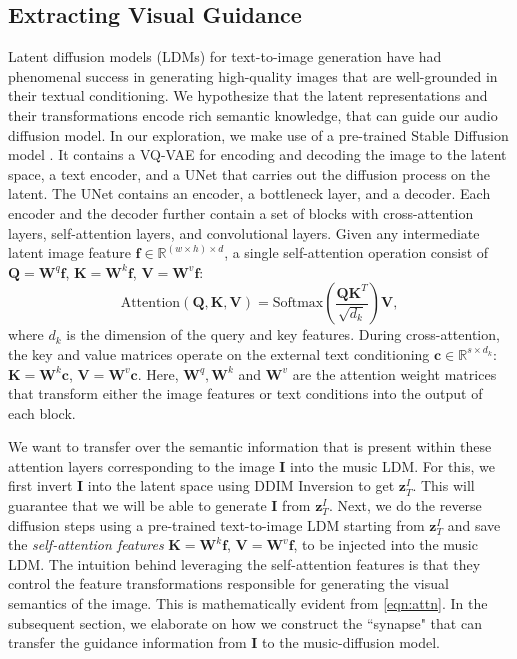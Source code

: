 \subsection{Extracting Visual Guidance} \label{sec:extracting_guidance}
Latent diffusion models (LDMs) for text-to-image generation \cite{rombach2022high} have had phenomenal success in generating high-quality images that are well-grounded in their textual conditioning. We hypothesize that the latent representations and their transformations encode rich semantic knowledge, that can guide our audio diffusion model. In our exploration, we make use of a pre-trained Stable Diffusion model \cite{rombach2022high}. It contains a VQ-VAE \cite{van2017neural} for encoding and decoding the image to the latent space, a text encoder, and a UNet \cite{unet} that carries out the diffusion process on the latent. The UNet contains an encoder, a bottleneck layer, and a decoder. Each encoder and the decoder further contain a set of blocks with cross-attention layers, self-attention layers, and convolutional layers. Given any intermediate latent image feature $\bm{f} \in \mathbb{R}^{(w \times h) \times d}$, a single self-attention \cite{attention} operation consist of $\bm{Q} = \bm{W}^q \bm{f}$, $\bm{K} = \bm{W}^k \bm{f}$, $\bm{V} = \bm{W}^v \bm{f}$:
\begin{equation}
    \text{Attention}(\bm{Q}, \bm{K}, \bm{V}) = \text{Softmax}\left(\frac{\bm{Q} \bm{K}^T}{\sqrt{d_k}}\right)\bm{V},
    \label{eqn:attn}
\end{equation}
where $d_k$ is the dimension of the query and key features. During cross-attention, the key and value matrices operate on the external text conditioning $\bm{c} \in \mathbb{R}^{s \times d_k}$: $\bm{K} = \bm{W}^k \bm{c}$, $\bm{V} = \bm{W}^v \bm{c}$. Here, $\bm{W}^q, \bm{W}^k $ and $ \bm{W}^v$ are the attention weight matrices that transform either the image features or text conditions into the output of each block.

We want to transfer over the semantic information that is present within these attention layers corresponding to the image $\bm{I}$ into the music LDM. For this, we first invert $\bm{I}$ into the latent space using DDIM Inversion \cite{song2020denoising} to get $\bm{z}^{I}_{T}$. This will guarantee that we will be able to generate $\bm{I}$ from $\bm{z}^{I}_{T}$. Next, we do the reverse diffusion steps using a pre-trained text-to-image LDM starting from $\bm{z}^{I}_{T}$ and save the \textit{self-attention features} $\bm{K} = \bm{W}^k \bm{f}$, $\bm{V} = \bm{W}^v \bm{f}$, to be injected into the music LDM. The intuition behind leveraging the self-attention features is that they control the feature transformations responsible for generating the visual semantics of the image. This is mathematically evident from \cref{eqn:attn}. 
In the subsequent section, we elaborate on how we construct the ``synapse" that can transfer the guidance information from $\bm{I}$ to the music-diffusion model.

